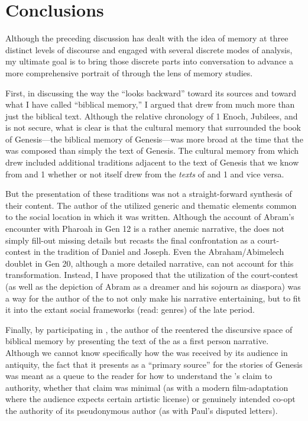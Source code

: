 \section{Conclusions}

Although the preceding discussion has dealt with the idea of memory at three distinct levels of discourse and engaged with several discrete modes of analysis, my ultimate goal is to bring those discrete parts into conversation to advance a more comprehensive portrait of \ga through the lens of memory studies.

First, in discussing the way the \ga ``looks backward'' toward its sources and toward what I have called ``biblical memory,'' I argued that \ga drew from much more than just the biblical text. Although the relative chronology of 1 Enoch, Jubilees, and \ga is not secure, what is clear is that the cultural memory that surrounded the book of Genesis---the biblical memory of Genesis---was more broad at the time that the \ga was composed than simply the text of Genesis. The cultural memory from which \ga drew included additional traditions adjacent to the text of Genesis that we know from \jub and 1 \enoch whether or not \ga itself drew from the \emph{texts} of \jub and 1 \enoch and vice versa.

But the presentation of these traditions was not a straight-forward synthesis of their content. The author of the \ga utilized generic and thematic elements common to the social location in which it was written. Although the account of Abram's encounter with Pharoah in Gen 12 is a rather anemic narrative, the \ga does not simply fill-out missing details but recasts the final confrontation as a court-contest in the tradition of Daniel and Joseph. Even the Abraham/Abimelech doublet in Gen 20, although a more detailed narrative, can not account for this transformation. Instead, I have proposed that the utilization of the court-contest (as well as the depiction of Abram as a dreamer and his sojourn as diaspora) was a way for the author of the \ga to not only make his narrative entertaining, but to fit it into the extant social frameworks (read: genres) of the late \secondtemple period.

Finally, by participating in \psy, the author of the \ga reentered the discursive space of biblical memory by presenting the text of the \ga as a first person narrative. Although we cannot know specifically how the \ga was received by its audience in antiquity, the fact that it presents as a ``primary source'' for the stories of Genesis was meant as a queue to the reader for how to understand the \ga's claim to authority, whether that claim was minimal (as with a modern film-adaptation where the audience expects certain artistic license) or genuinely intended co-opt the authority of its pseudonymous author (as with Paul's disputed letters).

